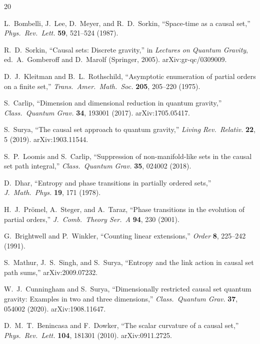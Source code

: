 \documentclass[12pt,a4paper]{article}
\begin{document}
\begin{thebibliography}{20}

L.~Bombelli, J.~Lee, D.~Meyer, and R.~D.~Sorkin,
``Space-time as a causal set,''
\textit{Phys.\ Rev.\ Lett.} \textbf{59}, 521--524 (1987).

R.~D.~Sorkin,
``Causal sets: Discrete gravity,''
in \textit{Lectures on Quantum Gravity}, ed.\ A.~Gomberoff and D.~Marolf
(Springer, 2005). arXiv:gr-qc/0309009.

D.~J.~Kleitman and B.~L.~Rothschild,
``Asymptotic enumeration of partial orders on a finite set,''
\textit{Trans.\ Amer.\ Math.\ Soc.} \textbf{205}, 205--220 (1975).

S.~Carlip,
``Dimension and dimensional reduction in quantum gravity,''
\textit{Class.\ Quantum Grav.} \textbf{34}, 193001 (2017).
arXiv:1705.05417.

S.~Surya,
``The causal set approach to quantum gravity,''
\textit{Living Rev.\ Relativ.} \textbf{22}, 5 (2019).
arXiv:1903.11544.

S.~P.~Loomis and S.~Carlip,
``Suppression of non-manifold-like sets in the causal set path integral,''
\textit{Class.\ Quantum Grav.} \textbf{35}, 024002 (2018).

D.~Dhar,
``Entropy and phase transitions in partially ordered sets,''
\textit{J.\ Math.\ Phys.} \textbf{19}, 171 (1978).

H.~J.~Pr{\"o}mel, A.~Steger, and A.~Taraz,
``Phase transitions in the evolution of partial orders,''
\textit{J.\ Comb.\ Theory Ser.\ A} \textbf{94}, 230 (2001).

G.~Brightwell and P.~Winkler,
``Counting linear extensions,''
\textit{Order} \textbf{8}, 225--242 (1991).

S.~Mathur, J.~S.~Singh, and S.~Surya,
``Entropy and the link action in causal set path sums,''
arXiv:2009.07232.

W.~J.~Cunningham and S.~Surya,
``Dimensionally restricted causal set quantum gravity: Examples in two and
three dimensions,''
\textit{Class.\ Quantum Grav.} \textbf{37}, 054002 (2020).
arXiv:1908.11647.

D.~M.~T.~Benincasa and F.~Dowker,
``The scalar curvature of a causal set,''
\textit{Phys.\ Rev.\ Lett.} \textbf{104}, 181301 (2010).
arXiv:0911.2725.


\end{thebibliography}
\end{document}
